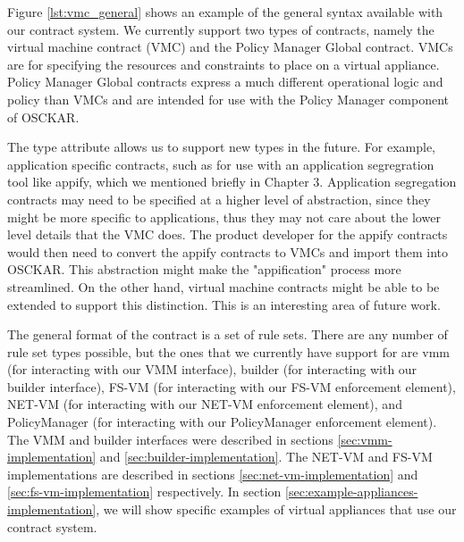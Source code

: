 Figure \ref{lst:vmc_general} shows an example of the general syntax available with our contract system. We currently support two types of contracts, namely the virtual machine contract (VMC) and the Policy Manager Global contract. VMCs are for specifying the resources and constraints to place on a virtual appliance. Policy Manager Global contracts express a much different operational logic and policy than VMCs and are intended for use with the Policy Manager component of OSCKAR. 

The type attribute allows us to support new types in the future. For example, application specific contracts, such as for use with an application segregration tool like appify, which we mentioned briefly in Chapter 3. Application segregation contracts may need to be specified at a higher level of abstraction, since they might be more specific to applications, thus they may not care about the lower level details that the VMC does. The product developer for the appify contracts would then need to convert the appify contracts to VMCs and import them into OSCKAR. This abstraction might make the "appification" process more streamlined. On the other hand, virtual machine contracts might be able to be extended to support this distinction. This is an interesting area of future work.

The general format of the contract is a set of rule sets. There are any number of rule set types possible, but the ones that we currently have support for are vmm (for interacting with our VMM interface), builder (for interacting with our builder interface), FS-VM (for interacting with our FS-VM enforcement element), NET-VM (for interacting with our NET-VM enforcement element), and PolicyManager (for interacting with our PolicyManager enforcement element). The VMM and builder interfaces were described in sections \ref{sec:vmm-implementation} and \ref{sec:builder-implementation}. The NET-VM and FS-VM implementations are described in sections \ref{sec:net-vm-implementation} and \ref{sec:fs-vm-implementation} respectively. In section \ref{sec:example-appliances-implementation}, we will show specific examples of virtual appliances that use our contract system.


